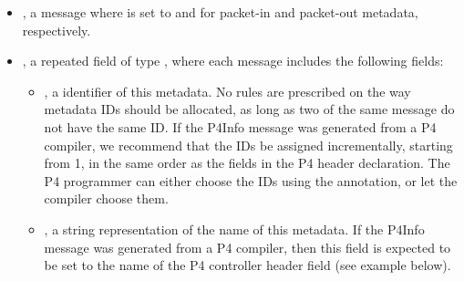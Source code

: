 \documentclass[11pt]{article}
\begin{document}
{%
\begin{itemize}%

\item{}
, a  message where  is set to 
and  for packet-in and packet-out metadata, respectively.%

\item{}
, a repeated field of type , where each  message
includes the following fields:%

\begin{itemize}[noitemsep,topsep=\mdcompacttopsep]%

\item{}, a  identifier of this metadata. No rules are prescribed on
the way metadata IDs should be allocated, as long as two  of the
same  message do not have the same ID. If the
P4Info message was generated from a P4 compiler, we recommend that the IDs
be assigned incrementally, starting from 1, in the same order as the
fields in the P4 header declaration. The P4 programmer can either choose
the IDs using the  annotation, or let the compiler choose them.%

\item{}, a string representation of the name of this metadata. If the
P4Info message was generated from a P4 compiler, then this field is
expected to be set to the name of the P4 controller header field (see
example below).%


\end{itemize}
\end{itemize}}
\end{document}
